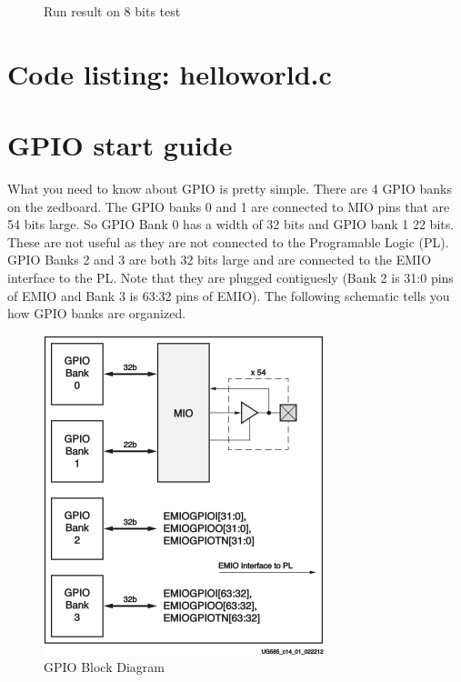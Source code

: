 \documentclass{article}
\begin{document}
\begin{enumerate}
\begin{figure}[!h]
\begin{center}
	\end{center}
	\caption{Run result on 8 bits test}
	\end{figure}
		\end{enumerate}
		\newpage
\begin{appendices}
\section{Code listing: helloworld.c}
	\label{sec:CODE}
		\begin{alltt}
		
		\end{alltt}
\section{GPIO start guide}
\label{sec:GPIOSG}
	What you need to know about GPIO is pretty simple. There are 4 GPIO banks on
	the zedboard.
	The GPIO banks 0 and 1 are connected to MIO pins that are 54 bits large. So
	GPIO Bank 0 has a width of 32 bits and GPIO bank 1 22 bits. These are not
	useful as they are not connected to the Programable Logic (PL).
	GPIO Banks 2 and 3 are both 32 bits large and are connected to the EMIO
	interface to the PL. Note that they are plugged contiguesly (Bank 2 is 31:0
			pins of EMIO and Bank 3 is 63:32 pins of EMIO).
	The following schematic tells you how GPIO banks are organized. \\
	\begin{figure}[!h]
	\begin{center}
	\includegraphics{pictures/GPIOBD.png}
	\caption{GPIO Block Diagram}
	\end{center}
	\end{figure}
	

\end{appendices}
\end{document}
